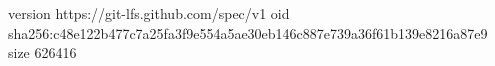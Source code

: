 version https://git-lfs.github.com/spec/v1
oid sha256:c48e122b477c7a25fa3f9e554a5ae30eb146c887e739a36f61b139e8216a87e9
size 626416
